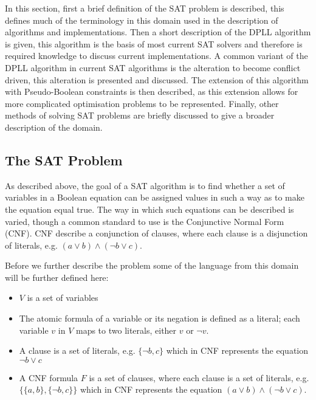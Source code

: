 In this section, first a brief definition of the SAT problem is described, this defines much of the terminology in this domain used in the description of algorithms and implementations. 
Then a short description of the DPLL algorithm is given, this algorithm is the basis of most current SAT solvers and therefore is required knowledge to discuss current implementations.
A common variant of the DPLL algorithm in current SAT algorithms is the alteration to become conflict driven,
this alteration is presented and discussed.
The extension of this algorithm with Pseudo-Boolean constraints is then described,
as this extension allows for more complicated optimisation problems to be represented.
Finally, other methods of solving SAT problems are briefly discussed to give a broader description of the domain. 

\subsection{The SAT Problem}
As described above, the goal of a SAT algorithm is to find whether a set of variables in a Boolean equation can be assigned values in such a way as to make the equation equal true.
The way in which such equations can be described is varied, though a common standard to use is the Conjunctive Normal Form (CNF).
CNF describe a conjunction of clauses, where each clause is a disjunction of literals, e.g. $(a \vee b) \wedge (\neg b \vee c)$.

Before we further describe the problem some of the language from this domain will be further defined here:
\begin{itemize}
  \item $V$ is a set of variables
  \item The atomic formula of a variable or its negation is defined as a literal; each variable $v$ in $V$ maps to two literals, either $v$ or $\neg v$.
  \item A clause is a set of literals, e.g. $\{\neg b, c\}$ which in CNF represents the equation $\neg b \vee c$
  \item A CNF formula $F$ is a set of clauses, where each clause is a set of literals, e.g. $\{\{a, b\} , \{\neg b, c\} \}$ which in CNF represents the equation $(a \vee b) \wedge (\neg b \vee c)$.
\end{itemize}

